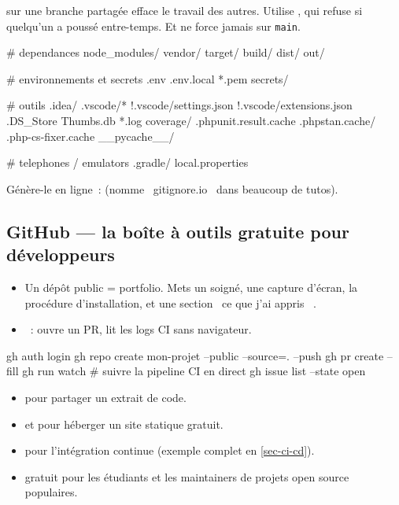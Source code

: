 \begin{piege}
 sur une branche partag\'ee efface le travail des autres. Utilise
, qui refuse si quelqu'un a pouss\'e entre-temps. Et ne force
jamais sur \verb|main|.
\end{piege}

\begin{codeconf}
# dependances
node_modules/
vendor/
target/
build/
dist/
out/

# environnements et secrets
.env
.env.local
*.pem
secrets/

# outils
.idea/
.vscode/*
!.vscode/settings.json
!.vscode/extensions.json
.DS_Store
Thumbs.db
*.log
coverage/
.phpunit.result.cache
.phpstan.cache/
.php-cs-fixer.cache
__pycache__/

# telephones / emulators
.gradle/
local.properties
\end{codeconf}

G\'en\`ere-le en ligne~: 
(nomme \og ~gitignore.io~ \fg{} dans beaucoup de tutos).

\subsection{GitHub --- la bo\^ite \`a outils gratuite pour d\'eveloppeurs}

\begin{itemize}
  \item Un d\'ep\^ot public = portfolio. Mets un  soign\'e, une capture d'\'ecran,
        la proc\'edure d'installation, et une section \og ~ce que j'ai appris~ \fg{}.
  \item {}~: ouvre un PR, lit les logs CI sans navigateur.
\end{itemize}

\begin{terminal}
gh auth login
gh repo create mon-projet --public --source=. --push
gh pr create --fill
gh run watch                  # suivre la pipeline CI en direct
gh issue list --state open
\end{terminal}

\begin{itemize}
  \item {} pour partager un extrait de code.
  \item {} et
         pour h\'eberger un site statique gratuit.
  \item {} pour l'int\'egration continue
        (exemple complet en \cref{sec-ci-cd}).
  \item {} gratuit pour les \'etudiants et
        les maintainers de projets open source populaires.
\end{itemize}

